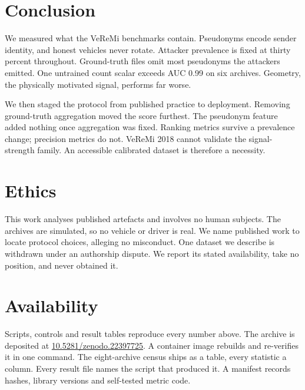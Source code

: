 \documentclass[journal,twoside]{IEEEtran}
\begin{document}
\section{Conclusion}

We measured what the VeReMi benchmarks contain.
Pseudonyms encode sender identity, and honest vehicles never rotate.
Attacker prevalence is fixed at thirty percent throughout.
Ground-truth files omit most pseudonyms the attackers emitted.
One untrained count scalar exceeds AUC 0.99 on six archives.
Geometry, the physically motivated signal, performs far worse.

We then staged the protocol from published practice to deployment.
Removing ground-truth aggregation moved the score furthest.
The pseudonym feature added nothing once aggregation was fixed.
Ranking metrics survive a prevalence change; precision metrics do not.
VeReMi 2018 cannot validate the signal-strength family.
An accessible calibrated dataset is therefore a necessity.

\section*{Ethics}

This work analyses published artefacts and involves no human subjects.
The archives are simulated, so no vehicle or driver is real.
We name published work to locate protocol choices, alleging no misconduct.
One dataset we describe is withdrawn under an authorship dispute.
We report its stated availability, take no position, and never obtained it.

\section*{Availability}

Scripts, controls and result tables reproduce every number above.
The archive is deposited at \url{10.5281/zenodo.22397725}.
A container image rebuilds and re-verifies it in one command.
The eight-archive census ships as a table, every statistic a column.
Every result file names the script that produced it.
A manifest records hashes, library versions and self-tested metric code.
\end{document}
